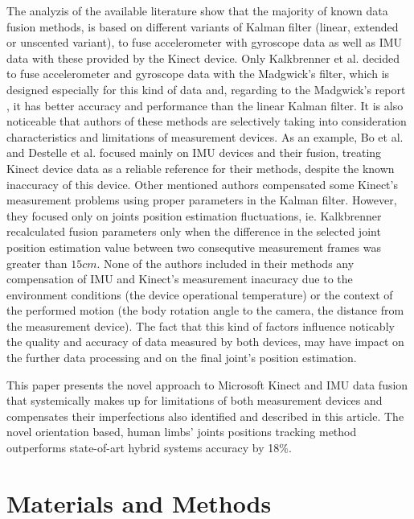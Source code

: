 \documentclass[sensors,article,submit,moreauthors,pdftex,10pt,a4paper]{mdpi}
\begin{document}
The analyzis of the available literature show that the majority of known data fusion methods, is based on different variants of Kalman filter (linear, extended or unscented variant), to fuse accelerometer with gyroscope data as well as IMU data with these provided by the Kinect device. Only Kalkbrenner et al. decided to fuse accelerometer and gyroscope data with the Madgwick's filter, which is designed especially for this kind of data and, regarding to the Madgwick's report \cite{Madgwick2011}, it has better accuracy and performance than the linear Kalman filter. It is also noticeable that authors of these methods are selectively taking into consideration characteristics and limitations of measurement devices. As an example, Bo et al. \cite{Bo2011a} and Destelle et al. \cite{Destelle2014} focused mainly on IMU devices and their fusion, treating Kinect device data as a reliable reference for their methods, despite the known inaccuracy of this device. Other mentioned authors compensated some Kinect's measurement problems using proper parameters in the Kalman filter. However, they focused only on joints position estimation fluctuations, ie. Kalkbrenner recalculated fusion parameters only when the difference in the selected joint position estimation value between two consequtive measurement frames was greater than $15cm$. None of the authors included in their methods any compensation of IMU and Kinect's measurement inacuracy due to the environment conditions (the device operational temperature) or the context of the performed motion (the body rotation angle to the camera, the distance from the measurement device). The fact that this kind of factors influence noticably the quality and accuracy of data measured by both devices, may have impact on the further data processing and on the final joint's position estimation.

This paper presents the novel approach to Microsoft Kinect and IMU data fusion that systemically makes up for limitations of both measurement devices and compensates their imperfections also identified and described in this article. The novel orientation based, human limbs’ joints positions tracking method outperforms state-of-art hybrid systems accuracy by 18\%.

\section{Materials and Methods}

\end{document}
